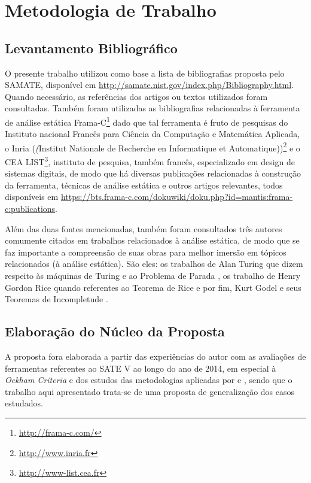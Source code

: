 \chapter{Metodologia de Trabalho}\label{metodologia}

\section{Levantamento Bibliográfico}

O presente trabalho utilizou como base  a lista de bibliografias proposta pelo SAMATE, disponível em \url{http://samate.nist.gov/index.php/Bibliography.html}. Quando necessário, as referências dos artigos ou textos utilizados foram consultadas. Também foram utilizadas as bibliografias relacionadas à ferramenta de análise estática Frama-C\footnote{\url{http://frama-c.com/}} dado que tal ferramenta é fruto de pesquisas do Instituto nacional Francês para Ciência da Computação e Matemática Aplicada, o Inria (\textit(Institut Nationale de Recherche en Informatique et Automatique))\footnote{\url{http://www.inria.fr}} e o CEA LIST\footnote{\url{http://www-list.cea.fr}}, instituto de pesquisa, também francês, especializado em design de sistemas digitais, de modo que há diversas publicações relacionadas à construção da ferramenta, técnicas de análise estática e outros artigos relevantes, todos disponíveis em \url{https://bts.frama-c.com/dokuwiki/doku.php?id=mantis:frama-c:publications}.

Além das duas fontes mencionadas, também foram consultados três autores comumente citados em trabalhos relacionados à análise estática, de modo que se faz importante a compreensão de suas obras para melhor imersão em tópicos relacionados (à análise estática). São eles: os trabalhos de Alan Turing que dizem respeito às máquinas de Turing e ao Problema de Parada \cite{turing}, os trabalho de Henry Gordon Rice quando referentes ao Teorema de Rice \cite{rice} e por fim, Kurt Godel e seus Teoremas de Incompletude \cite{godel}.

\section{Elaboração do Núcleo da Proposta}

A proposta fora elaborada a partir das experiências do autor com as avaliações de ferramentas referentes ao SATE V ao longo do ano de 2014, em especial à \textit{Ockham Criteria} e dos estudos das metodologias aplicadas por \cite{harvard} e \cite{nsa}, sendo que o trabalho aqui apresentado trata-se de uma proposta de generalização dos casos estudados.

